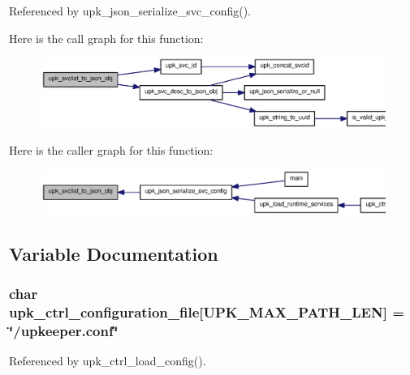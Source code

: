 Referenced by upk\_\-json\_\-serialize\_\-svc\_\-config().



Here is the call graph for this function:\nopagebreak
\begin{figure}[H]
\begin{center}
\leavevmode
\includegraphics[width=400pt]{group__config__impl_ga82376799c5e86edd919376c308139d8b_cgraph}
\end{center}
\end{figure}




Here is the caller graph for this function:\nopagebreak
\begin{figure}[H]
\begin{center}
\leavevmode
\includegraphics[width=400pt]{group__config__impl_ga82376799c5e86edd919376c308139d8b_icgraph}
\end{center}
\end{figure}




\subsection{Variable Documentation}
\subsubsection[{upk\_\-ctrl\_\-configuration\_\-file}]{\setlength{\rightskip}{0pt plus 5cm}char {\bf upk\_\-ctrl\_\-configuration\_\-file}[UPK\_\-MAX\_\-PATH\_\-LEN] = \char`\"{}/upkeeper.conf\char`\"{}}\label{group__config__impl_ga60eaf9d484f5d0b644ff676f986debd0}


Referenced by upk\_\-ctrl\_\-load\_\-config().

